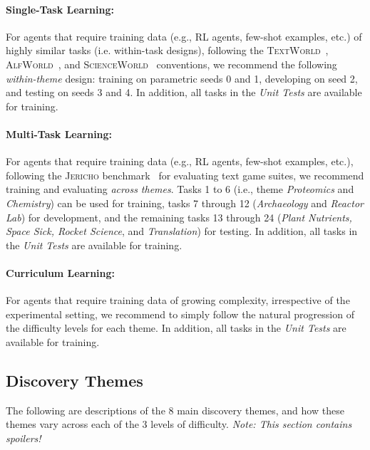 \paragraph{Single-Task Learning:} For agents that require training data (e.g., RL agents, few-shot examples, etc.) of highly similar tasks (i.e. within-task designs), following the \textsc{TextWorld}~\citep{Ct2018TextWorldAL}, \textsc{AlfWorld}~\citep{Shridhar2020ALFWorldAT}, and \textsc{ScienceWorld}~\citep{wang2022scienceworld} conventions, we recommend the following \textit{within-theme} design: training on parametric seeds 0 and 1, developing on seed 2, and testing on seeds 3 and 4.  In addition, all tasks in the \textit{Unit Tests} are available for training.

\paragraph{Multi-Task Learning:} For agents that require training data (e.g., RL agents, few-shot examples, etc.), following the \textsc{Jericho} benchmark~\citep{Hausknecht2019InteractiveFG} for evaluating text game suites, we recommend training and evaluating \textit{across themes}.  Tasks 1 to 6 (i.e., theme \textit{Proteomics} and \textit{Chemistry}) can be used for training, tasks 7 through 12 (\textit{Archaeology} and \textit{Reactor Lab}) for development, and the remaining tasks 13 through 24 (\textit{Plant Nutrients, Space Sick, Rocket Science}, and \textit{Translation}) for testing.  In addition, all tasks in the \textit{Unit Tests} are available for training.

\paragraph{Curriculum Learning:} For agents that require training data of growing complexity, irrespective of the experimental setting, we recommend to simply follow the natural progression of the difficulty levels for each theme. In addition, all tasks in the \textit{Unit Tests} are available for training.



\subsection{Discovery Themes}
\label{sec:appendix-discovery-themes}

The following are descriptions of the 8 main discovery themes, and how these themes vary across each of the 3 levels of difficulty.  \textit{Note: This section contains spoilers!}

